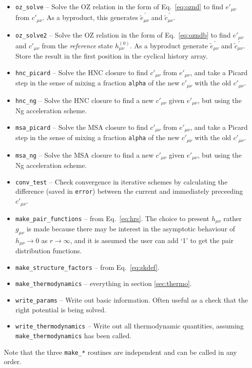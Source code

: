 \documentclass[12pt,a4paper]{article}
\newcommand{\myprime}{^{{}\,\prime}}
\newcommand{\href}{h^{(0)}}
\newcommand{\Eqref}[1]{Eq.~\eqref{#1}}
\begin{document}
\begin{itemize}
%
\item\verb+oz_solve+ -- Solve the OZ relation in the form of
  \Eqref{eq:oznd} to find $e'_{\mu\nu}$ from $c'_{\mu\nu}$.  As a
  byproduct, this generates ${\tilde e}_{\mu\nu}\myprime$ and ${\tilde
    c}_{\mu\nu}\myprime$.
%
\item\verb+oz_solve2+ -- Solve the OZ relation in the form of
  \Eqref{eq:ozndb} to find $e'_{\mu\nu}$ and $c'_{\mu\nu}$ from the
  \emph{reference} state $\href_{\mu\nu}$.  As a byproduct generate
  ${\tilde e}_{\mu\nu}\myprime$ and ${\tilde c}_{\mu\nu}\myprime$.
  Store the result in the first position in the cyclical history
  array.
%
\item\verb+hnc_picard+ -- Solve the HNC closure to find $c'_{\mu\nu}$
  from $e'_{\mu\nu}$, and take a Picard step in the sense of mixing a
  fraction \verb+alpha+ of the new $c'_{\mu\nu}$ with the old
  $c'_{\mu\nu}$.
%
\item\verb+hnc_ng+ -- Solve the HNC closure to find a new
$c'_{\mu\nu}$ given $e'_{\mu\nu}$, but using the Ng acceleration scheme.
%
\item\verb+msa_picard+ -- Solve the MSA closure to find $c'_{\mu\nu}$
  from $e'_{\mu\nu}$, and take a Picard step in the sense of mixing a
  fraction \verb+alpha+ of the new $c'_{\mu\nu}$ with the old
  $c'_{\mu\nu}$.
%
\item\verb+msa_ng+ -- Solve the MSA closure to find a new
$c'_{\mu\nu}$ given $e'_{\mu\nu}$, but using the Ng acceleration scheme.
%
\item\verb+conv_test+ -- Check convergence in iterative schemes by
  calculating the difference (saved in \verb+error+) between the
  current and immediately preceeding $c'_{\mu\nu}$.
%
\item\verb+make_pair_functions+ -- from \Eqref{eq:hrs}.  The
  choice to present $h_{\mu\nu}$ rather $g_{\mu\nu}$ is made because
  there may be interest in the asymptotic behaviour of
  $h_{\mu\nu}\to0$ as $r\to\infty$, and it is assumed the user can add
  `1' to get the pair distribution functions.
%
\item\verb+make_structure_factors+ -- from \Eqref{eq:skdef}.
%
\item\verb+make_thermodynamics+ -- everything in section
  \ref{sec:thermo}.
%
\item\verb+write_params+ -- Write out basic information.  Often useful
  as a check that the right potential is being solved.
%
\item\verb+write_thermodynamics+ -- Write out all thermodynamic
  quantities, assuming \verb+make_thermodynamics+ has been called.
%
\end{itemize}
%
Note that the three \verb+make_*+ routines are independent and can be
called in any order.
\end{document}
